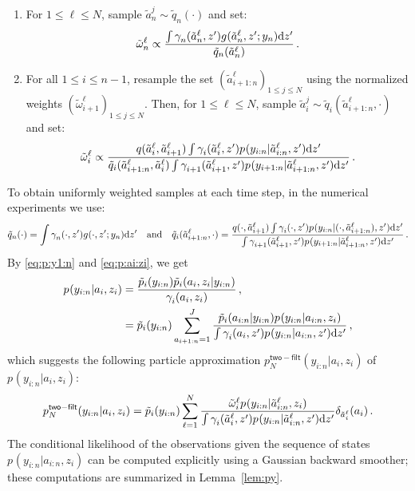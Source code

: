 \begin{enumerate}[-]
\item For $1\le \ell \le N$, sample $\tilde{a}^{j}_n\sim\tilde{q}_n(\cdot)$ and set:
\[
\tilde{\omega}^{\ell}_n \propto \frac{\int\gamma^{}_n(\tilde{a}^{\ell}_n,z')g_{}(\tilde{a}^{\ell}_n,z';y_n)\mathrm{d} z'}{\tilde{q}_n(\tilde{a}^{\ell}_n)}\,.
\]
\item For all $1\le i \le n-1$, resample the set $(\tilde{a}^{\ell}_{i+1:n})_{1\le j\le N}$ using the normalized weights $(\tilde{\omega}^{\ell}_{i+1})_{1\le j \le N}$. Then, for $1\le \ell \le N$, sample $\tilde{a}^{j}_{i}\sim\tilde{q}_i(\tilde{a}^{\ell}_{i+1:n},\cdot)$  and set:
\[
\tilde{\omega}^{\ell}_i \propto \frac{q(\tilde{a}^{\ell}_i,\tilde{a}^{\ell}_{i+1})\int \gamma^{}_i(\tilde{a}^{\ell}_i,z')p_{}(y_{i:n}|\tilde{a}^{\ell}_{i:n},z')\mathrm{d} z'}{\tilde{q}_i(\tilde{a}^{\ell}_{i+1:n},\tilde{a}^{\ell}_i)\int \gamma^{}_{i+1}(\tilde{a}^{\ell}_{i+1},z')p_{}(y_{i+1:n}|\tilde{a}^{\ell}_{i+1:n},z')\mathrm{d} z'}\,.
\]
\end{enumerate}
To obtain uniformly weighted samples at each time step, in the numerical experiments we use:
\[
\tilde{q}_n(\cdot) = \int\gamma^{}_n(\cdot,z')g_{}(\cdot,z';y_n)\mathrm{d} z'\quad\mbox{and}\quad \tilde{q}_i(\tilde{a}^{\ell}_{i+1:n},\cdot) = \frac{q(\cdot,\tilde{a}^{\ell}_{i+1})\int \gamma^{}_i(\cdot,z')p_{}(y_{i:n}|(\cdot,\tilde{a}^{\ell}_{i+1:n}),z')\mathrm{d} z'}{\int \gamma^{}_{i+1}(\tilde{a}^{\ell}_{i+1},z')p_{}(y_{i+1:n}|\tilde{a}^{\ell}_{i+1:n},z')\mathrm{d} z'}\,.
\]
By \eqref{eq:p:y1:n} and \eqref{eq:p:ai:zi}, we get
\begin{align*}
p_{}(y_{i:n}|a_i,z_i)
&= \frac{\tilde{p}_{i}(y_{i:n})  \tilde{p}_{i}(a_i,z_i|y_{i:n})}{\gamma^{}_{i}(a_i,z_i)}\,, \\
&= \tilde{p}_{i}(y_{i:n})  \sum_{a_{i+1:n}=1}^J\frac{\tilde{p}_{i}(a_{i:n}|y_{i:n})p_{}(y_{i:n}|a_{i:n},z_{i})}{\int \gamma^{}_{i}(a_i,z')p_{}(y_{i:n}|a_{i:n},z')\mathrm{d} z'}\label{eq:p:ai:zi}\,,
\end{align*}
which suggests the following particle approximation $p^{\mathsf{two-filt}}_{N}(y_{i:n}|a_{i},z_{i})$ of $p_{}(y_{i:n}|a_{i},z_{i})$:
\[
p^{\mathsf{two-filt}}_{N}(y_{i:n}|a_{i},z_{i}) = \tilde{p}_{i}(y_{i:n}) \sum_{\ell=1}^N\frac{\tilde{\omega}^{\ell}_i p_{}(y_{i:n}|\tilde{a}^{\ell}_{i:n},z_{i})}{\int \gamma^{}_{i}(\tilde{a}^{\ell}_i,z')p_{}(y_{i:n}|\tilde{a}^{\ell}_{i:n},z')\mathrm{d} z'}\delta_{\tilde{a}^{\ell}_{i}}(a_{i})\,.
\]
The conditional likelihood of the observations given the sequence of states $p_{}(y_{i:n}|a_{i:n},z_{i})$ can be computed explicitly using a Gaussian backward smoother; these computations are summarized in Lemma~\ref{lem:py}.
